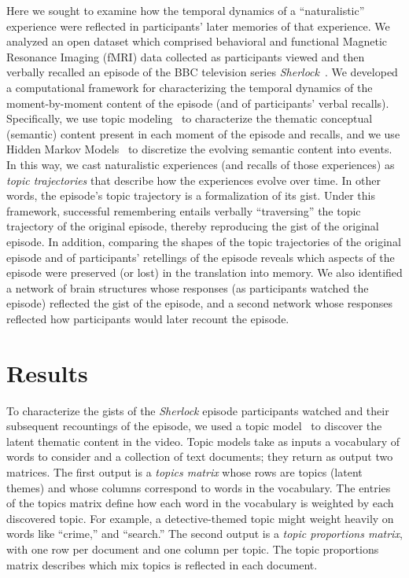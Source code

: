 \documentclass{article}
\begin{document}
Here we sought to examine how the temporal dynamics of a ``naturalistic'' experience were reflected in participants' later memories of that experience.  We analyzed an open dataset which comprised behavioral and functional Magnetic Resonance Imaging (fMRI) data collected as participants viewed and then verbally recalled an episode of the BBC television series \textit{Sherlock}~\citep{ChenEtal17}.  We developed a computational framework for characterizing the temporal dynamics of the moment-by-moment content of the episode (and of participants' verbal recalls).  Specifically, we use topic modeling~\citep{BleiEtal03} to characterize the thematic conceptual (semantic) content present in each moment of the episode and recalls, and we use Hidden Markov Models~\citep{Rabi89, BaldEtal17} to discretize the evolving semantic content into events.  In this way, we cast naturalistic experiences (and recalls of those experiences) as \textit{topic trajectories} that describe how the experiences evolve over time.  In other words, the episode's topic trajectory is a formalization of its gist.  Under this framework, successful remembering entails verbally ``traversing'' the topic trajectory of the original episode, thereby reproducing the gist of the original episode.  In addition, comparing the shapes of the topic trajectories of the original episode and of participants' retellings of the episode reveals which aspects of the episode were preserved (or lost) in the translation into memory.  We also identified a network of brain structures whose responses (as participants watched the episode) reflected the gist of the episode, and a second network whose responses reflected how participants would later recount the episode.


\section*{Results}
To characterize the gists of the \textit{Sherlock} episode participants watched and their subsequent recountings of the episode, we used a topic model~\citep{BleiEtal03} to discover the latent thematic content in the video.  Topic models take as inputs a vocabulary of words to consider and a collection of text documents; they return as output two matrices.  The first output is a \textit{topics matrix} whose rows are topics (latent themes) and whose columns correspond to words in the vocabulary. The entries of the topics matrix define how each word in the vocabulary is weighted by each discovered topic.  For example, a detective-themed topic might weight heavily on words like ``crime,'' and ``search.''  The second output is a \textit{topic proportions matrix}, with one row per document and one column per topic.  The topic proportions matrix describes which mix topics is reflected in each document.
\end{document}
